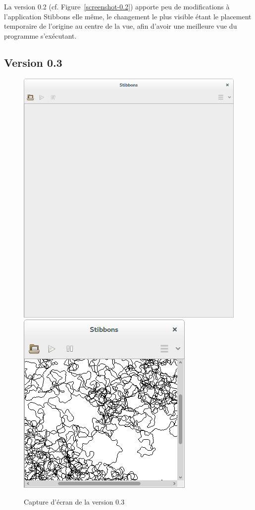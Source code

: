 La version 0.2 (cf. Figure~\ref{screenshot-0.2}) apporte peu de modifications à l'application Stibbons elle même, le changement le plus visible étant le placement temporaire de l'origine au centre de la vue, afin d'avoir une meilleure vue du programme s'exécutant.

\subsection{Version 0.3}

\begin{figure}[h]
\centering
\includegraphics[scale=0.25]{doc/report/screenshot/stibbons-0-3-1.png}
\includegraphics[scale=0.25]{doc/report/screenshot/stibbons-0-3-3.png}
\caption{\label{screenshot-0.3} Capture d'écran de la version 0.3}
\end{figure}

